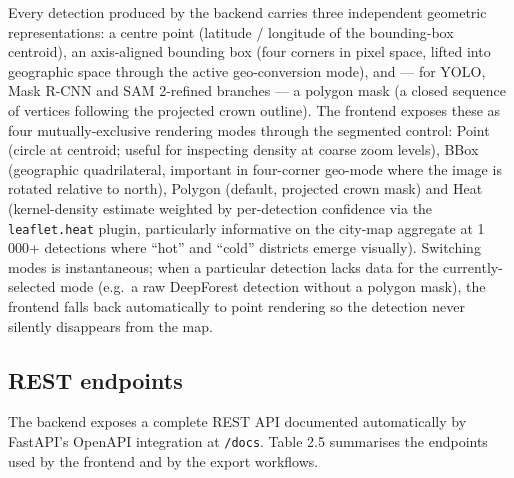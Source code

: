 Every detection produced by the backend carries three independent geometric representations: a centre point (latitude / longitude of the bounding-box centroid), an axis-aligned bounding box (four corners in pixel space, lifted into geographic space through the active geo-conversion mode), and --- for YOLO, Mask R-CNN and SAM 2-refined branches --- a polygon mask (a closed sequence of vertices following the projected crown outline). The frontend exposes these as four mutually-exclusive rendering modes through the segmented control: Point (circle at centroid; useful for inspecting density at coarse zoom levels), BBox (geographic quadrilateral, important in four-corner geo-mode where the image is rotated relative to north), Polygon (default, projected crown mask) and Heat (kernel-density estimate weighted by per-detection confidence via the \texttt{leaflet.heat} plugin, particularly informative on the city-map aggregate at 1 000+ detections where ``hot'' and ``cold'' districts emerge visually). Switching modes is instantaneous; when a particular detection lacks data for the currently-selected mode (e.g.~a raw DeepForest detection without a polygon mask), the frontend falls back automatically to point rendering so the detection never silently disappears from the map.

\subsection{REST endpoints}\label{rest-endpoints}

The backend exposes a complete REST API documented automatically by FastAPI's OpenAPI integration at \texttt{/docs}. Table 2.5 summarises the endpoints used by the frontend and by the export workflows.

